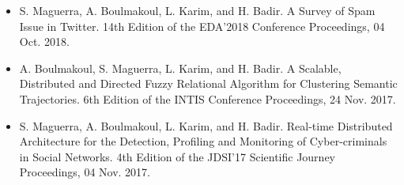 \begin{itemize}
	\item S. Maguerra, A. Boulmakoul, L. Karim, and H. Badir. A Survey of Spam Issue in Twitter. 14th Edition of the EDA’2018 Conference Proceedings, 04 Oct. 2018.
	\item A. Boulmakoul, S. Maguerra, L. Karim, and H. Badir. A Scalable, Distributed and Directed Fuzzy Relational Algorithm for Clustering Semantic Trajectories. 6th Edition of the INTIS Conference Proceedings, 24 Nov. 2017.
	\item S. Maguerra, A. Boulmakoul, L. Karim, and H. Badir. Real-time Distributed Architecture for the Detection, Profiling and Monitoring of Cyber-criminals in Social Networks. 4th Edition of the JDSI’17 Scientific Journey Proceedings, 04 Nov. 2017.
\end{itemize}

